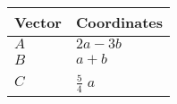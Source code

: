 \begin{tabular}{|m{5em}|m{10em}|}
    \hline
    Vector &Coordinates \\
    \hline
         $A$ & $2a-3b$ \\
    \hline
        $B$ & $a+b$ \\
    \hline
	$C$ & $\frac{5}{4}$ $a$ \\
    \hline
\end{tabular}
